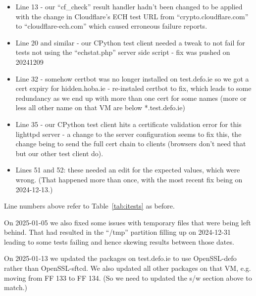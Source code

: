 \begin{itemize}
    \item Line 13 - our ``cf\_check'' result handler hadn't been changed to be
        applied with the change in Cloudflare's ECH test URL from
        ``crypto.cloudflare.com'' to ``cloudflare-ech.com'' which caused
        erroneous failure reports.

    \item Line 20 and similar - our CPython test client needed a tweak to not
        fail for tests not using the ``echstat.php'' server side script - fix
        was pushed on 20241209

    \item Line 32 - somehow certbot was no longer installed on test.defo.ie so
        we got a cert expiry for hidden.hoba.ie - re-instaled certbot to fix,
        which leads to some redundancy as we end up with more than one cert for
        some names (more or less all other name on that VM are below
        *.test.defo.ie)

    \item Line 35 - our CPython test client hits a certificate validation error
        for this lighttpd server - a change to the server configuration seems
        to fix this, the change being to send the full cert chain to clients
        (browsers don't need that but our other test client do).

    \item Lines 51 and 52: these needed an edit for the expected values, which were
        wrong. (That happened more than once, with the most recent fix being
        on 2024-12-13.)

\end{itemize}

Line numbers above refer to Table~\ref{tab:itests} as before.

On 2025-01-05 we also fixed some issues with temporary files that were being
left behind. That had resulted in the ``/tmp'' partition filling up on 2024-12-31
leading to some tests failing and hence skewing results between those dates.

On 2025-01-13 we updated the packages on test.defo.ie to use OpenSSL-defo rather
than OpenSSL-sftcd. We also updated all other packages on that VM, e.g. moving
from FF 133 to FF 134. (So we need to updated the s/w section above to match.)
